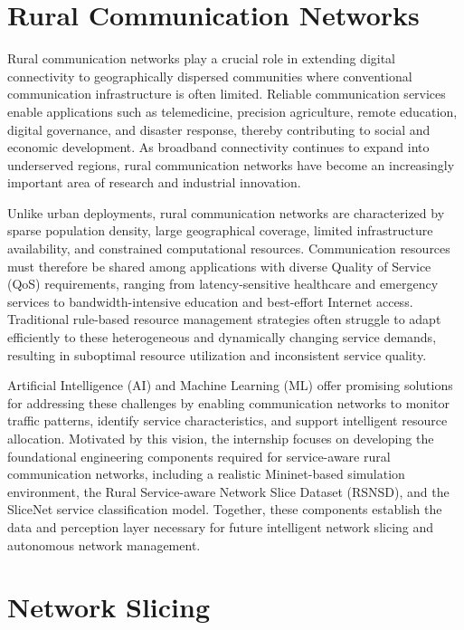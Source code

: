 \documentclass[12pt,a4paper]{report}
\begin{document}
	\section{Rural Communication Networks}
	\label{sec:rural}
	
Rural communication networks play a crucial role in extending digital connectivity to geographically dispersed communities where conventional communication infrastructure is often limited. Reliable communication services enable applications such as telemedicine, precision agriculture, remote education, digital governance, and disaster response, thereby contributing to social and economic development. As broadband connectivity continues to expand into underserved regions, rural communication networks have become an increasingly important area of research and industrial innovation.

Unlike urban deployments, rural communication networks are characterized by sparse population density, large geographical coverage, limited infrastructure availability, and constrained computational resources. Communication resources must therefore be shared among applications with diverse Quality of Service (QoS) requirements, ranging from latency-sensitive healthcare and emergency services to bandwidth-intensive education and best-effort Internet access. Traditional rule-based resource management strategies often struggle to adapt efficiently to these heterogeneous and dynamically changing service demands, resulting in suboptimal resource utilization and inconsistent service quality.

Artificial Intelligence (AI) and Machine Learning (ML) offer promising solutions for addressing these challenges by enabling communication networks to monitor traffic patterns, identify service characteristics, and support intelligent resource allocation. Motivated by this vision, the internship focuses on developing the foundational engineering components required for service-aware rural communication networks, including a realistic Mininet-based simulation environment, the Rural Service-aware Network Slice Dataset (RSNSD), and the SliceNet service classification model. Together, these components establish the data and perception layer necessary for future intelligent network slicing and autonomous network management.

	

	\section{Network Slicing}
	\label{sec:slicing}
	
\end{document}
